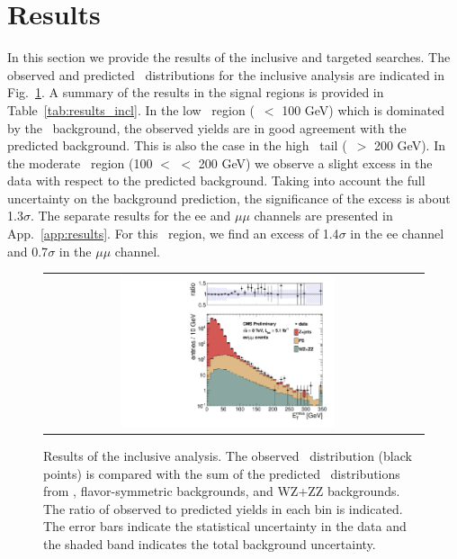 \clearpage

\section{Results}

In this section we provide the results of the inclusive and targeted searches. The observed and predicted \MET\ distributions for the
inclusive analysis are indicated in Fig.~\ref{fig:results_incl}. A summary of the results in the signal regions is provided in
Table~\ref{tab:results_incl}. In the low \MET\ region (\MET\ $<$ 100 GeV) which is dominated by the \zjets\ background, the observed
yields are in good agreement with the predicted background. This is also the case in the high \MET\ tail (\MET\ $>$ 200 GeV).
In the moderate \MET\ region (100 $<$ \MET $<$ 200 GeV) we observe a slight excess in the data with respect to the predicted background.
Taking into account the full uncertainty on the background prediction, the significance of the excess is about 1.3$\sigma$. 
The separate results for the ee and $\mu\mu$ channels are presented in App.~\ref{app:results}. For this \MET\ region, we find an excess
of 1.4$\sigma$ in the ee channel and 0.7$\sigma$ in the $\mu\mu$ channel.


\begin{figure}[!h]
\begin{center}
\begin{tabular}{cc}
\includegraphics[width=0.6\textwidth]{plots/met_0.pdf}
\end{tabular}
\caption{Results of the inclusive analysis. The observed \MET\ distribution (black points) is compared with the sum of the predicted \MET\
distributions from \zjets, flavor-symmetric backgrounds, and WZ+ZZ backgrounds. The ratio of observed to predicted yields in each bin is
indicated. The error bars indicate the statistical uncertainty in the data and the shaded band indicates the total background uncertainty.
\label{fig:results_incl}
}
\end{center}
\end{figure}



